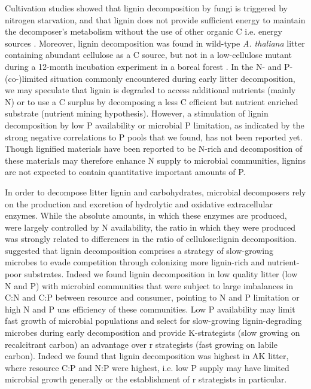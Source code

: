 Cultivation studies showed that lignin decomposition by fungi is triggered by nitrogen starvation, and that lignin does not provide sufficient energy to maintain the decomposer's metabolism without the use of other organic C i.e. energy sources \cite{Janshekar1988}. Moreover, lignin decomposition was found in wild-type \emph{A. thaliana} litter containing abundant cellulose as a C source, but not in a low-cellulose mutant during a 12-month incubation experiment in a boreal forest \cite{Talbot2011}. In the N- and P-(co-)limited situation commonly encountered during early litter decomposition, we may speculate that lignin is degraded to access additional nutrients (mainly N) or to use a C surplus by decomposing a less C efficient but nutrient enriched substrate (nutrient mining hypothesis). However, a stimulation of lignin decomposition by low P availability or microbial P limitation, as indicated by the strong negative correlations to P pools that we found, has not been reported yet. Though lignified materials have been reported to be N-rich and decomposition of these materials may therefore enhance N supply to microbial communities, lignins are not expected to contain quantitative important amounts of P.

In order to decompose litter lignin and carbohydrates, microbial decomposers rely on the production and excretion of hydrolytic and oxidative extracellular enzymes. While the absolute amounts, in which these enzymes are produced, were largely controlled by N availability, the ratio in which they were produced was strongly related to differences in the ratio of cellulose:lignin decomposition. \cite{Talbot2011} suggested that lignin decomposition comprises a strategy of slow-growing microbes to evade competition through colonizing more lignin-rich and nutrient-poor substrates. Indeed we found lignin decomposition in low quality litter (low N and P) with microbial communities that were subject to large imbalances in C:N and C:P between resource and consumer, pointing to N and P limitation or high N and P uns efficiency of these communities. Low P availability may limit fast growth of microbial populations and select for slow-growing lignin-degrading microbes during early decomposition and provide K-strategists (slow growing on recalcitrant carbon) an advantage over r strategists (fast growing on labile carbon). Indeed we found that lignin decomposition was highest in AK litter, where resource C:P and N:P were highest, i.e. low P supply may have limited microbial growth generally or the establishment of r strategists in particular.

